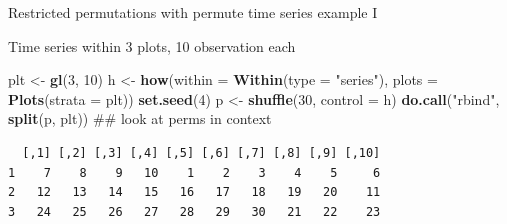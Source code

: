\documentclass[10pt,ignorenonframetext,compress, aspectratio=169]{beamer}
\newenvironment{Shaded}{\begin{snugshade}}{\end{snugshade}}
\newcommand{\KeywordTok}[1]{\textcolor[rgb]{0.13,0.29,0.53}{\textbf{{#1}}}}
\newcommand{\DataTypeTok}[1]{\textcolor[rgb]{0.13,0.29,0.53}{{#1}}}
\newcommand{\DecValTok}[1]{\textcolor[rgb]{0.00,0.00,0.81}{{#1}}}
\newcommand{\StringTok}[1]{\textcolor[rgb]{0.31,0.60,0.02}{{#1}}}
\newcommand{\NormalTok}[1]{{#1}}
\begin{document}
\begin{frame}[fragile]{Restricted permutations with permute \textbar{}
time series example I}

Time series within 3 plots, 10 observation each

\scriptsize

\begin{Shaded}
\begin{Highlighting}[]
\NormalTok{plt <-}\StringTok{ }\KeywordTok{gl}\NormalTok{(}\DecValTok{3}\NormalTok{, }\DecValTok{10}\NormalTok{)}
\NormalTok{h <-}\StringTok{ }\KeywordTok{how}\NormalTok{(}\DataTypeTok{within =} \KeywordTok{Within}\NormalTok{(}\DataTypeTok{type =} \StringTok{"series"}\NormalTok{),}
         \DataTypeTok{plots =} \KeywordTok{Plots}\NormalTok{(}\DataTypeTok{strata =} \NormalTok{plt))}
\KeywordTok{set.seed}\NormalTok{(}\DecValTok{4}\NormalTok{)}
\NormalTok{p <-}\StringTok{ }\KeywordTok{shuffle}\NormalTok{(}\DecValTok{30}\NormalTok{, }\DataTypeTok{control =} \NormalTok{h)}
\KeywordTok{do.call}\NormalTok{(}\StringTok{"rbind"}\NormalTok{, }\KeywordTok{split}\NormalTok{(p, plt)) ## look at perms in context}
\end{Highlighting}
\end{Shaded}

\begin{verbatim}
  [,1] [,2] [,3] [,4] [,5] [,6] [,7] [,8] [,9] [,10]
1    7    8    9   10    1    2    3    4    5     6
2   12   13   14   15   16   17   18   19   20    11
3   24   25   26   27   28   29   30   21   22    23
\end{verbatim}

\normalsize

\end{frame}
\end{document}
